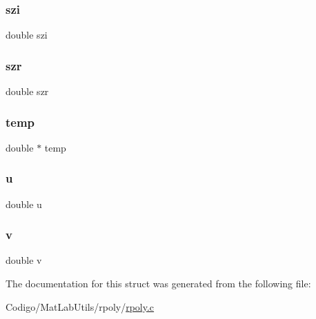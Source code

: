 \subsubsection{\texorpdfstring{szi}{szi}}
{\footnotesize\ttfamily double szi}

\mbox{\label{struct_r_poly___state_a3e54b6894f6a4694585055d4dd849c38}} 
\subsubsection{\texorpdfstring{szr}{szr}}
{\footnotesize\ttfamily double szr}

\mbox{\label{struct_r_poly___state_a5ba843ea941644bfad9c98c84d85d910}} 
\subsubsection{\texorpdfstring{temp}{temp}}
{\footnotesize\ttfamily double $\ast$ temp}

\mbox{\label{struct_r_poly___state_aed08c8478a62910aab06ba708a0e5b5f}} 
\subsubsection{\texorpdfstring{u}{u}}
{\footnotesize\ttfamily double u}

\mbox{\label{struct_r_poly___state_a3b90d5a73541ab9402511d87bed076ef}} 
\subsubsection{\texorpdfstring{v}{v}}
{\footnotesize\ttfamily double v}



The documentation for this struct was generated from the following file\+:\begin{DoxyCompactItemize}
\item 
Codigo/\+Mat\+Lab\+Utils/rpoly/\mbox{\hyperlink{rpoly_8c}{rpoly.\+c}}\end{DoxyCompactItemize}
